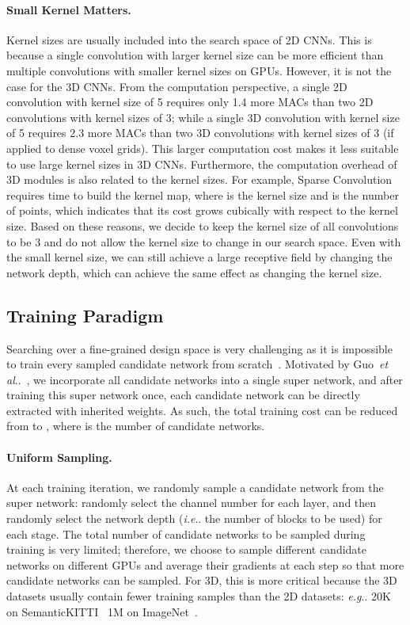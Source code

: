 \documentclass[runningheads]{llncs}
\makeatletter
\DeclareRobustCommand\onedot{\futurelet\@let@token\@onedot}
\def\@onedot{\ifx\@let@token.\else.\null\fi\xspace}
\def\eg{\emph{e.g}\onedot} \def\Eg{\emph{E.g}\onedot}
\def\ie{\emph{i.e}\onedot} \def\Ie{\emph{I.e}\onedot}
\def\etal{\emph{et al}\onedot}
\makeatother
\begin{document}
\paragraph{Small Kernel Matters.}

Kernel sizes are usually included into the search space of 2D CNNs. This is because a single convolution with larger kernel size can be more efficient than multiple convolutions with smaller kernel sizes on GPUs. However, it is not the case for the 3D CNNs. From the computation perspective, a single 2D convolution with kernel size of 5 requires only 1.4 more MACs than two 2D convolutions with kernel sizes of 3; while a single 3D convolution with kernel size of 5 requires 2.3 more MACs than two 3D convolutions with kernel sizes of 3 (if applied to dense voxel grids). This larger computation cost makes it less suitable to use large kernel sizes in 3D CNNs. Furthermore, the computation overhead of 3D modules is also related to the kernel sizes. For example, Sparse Convolution~\cite{graham20183d,choy20194d} requires  time to build the kernel map, where  is the kernel size and  is the number of points, which indicates that its cost grows cubically with respect to the kernel size. Based on these reasons, we decide to keep the kernel size of all convolutions to be 3 and do not allow the kernel size to change in our search space. Even with the small kernel size, we can still achieve a large receptive field by changing the network depth, which can achieve the same effect as changing the kernel size.

\subsection{Training Paradigm}

Searching over a fine-grained design space is very challenging as it is impossible to train every sampled candidate network from scratch~\cite{tan2019mnasnet}. Motivated by Guo~\etal~\cite{guo2019single}, we incorporate all candidate networks into a single super network, and after training this super network once, each candidate network can be directly extracted with inherited weights. As such, the total training cost can be reduced from  to , where  is the number of candidate networks.

\paragraph{Uniform Sampling.}

At each training iteration, we randomly sample a candidate network from the super network: randomly select the channel number for each layer, and then randomly select the network depth (\ie the number of blocks to be used) for each stage. The total number of candidate networks to be sampled during training is very limited; therefore, we choose to sample different candidate networks on different GPUs and average their gradients at each step so that more candidate networks can be sampled. For 3D, this is more critical because the 3D datasets usually contain fewer training samples than the 2D datasets: \eg 20K on SemanticKITTI~\cite{behley2019semantickitti} \vs 1M on ImageNet~\cite{deng2009imagenet}.
\end{document}
